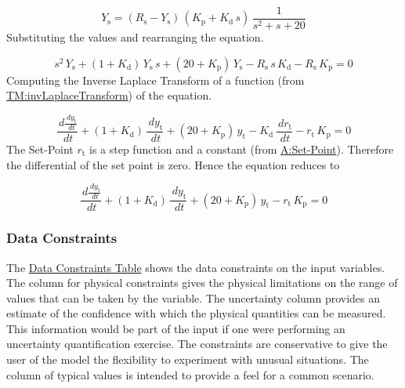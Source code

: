 \documentclass[12pt]{article}
\begin{document}
\begin{displaymath}
{Y_{\text{s}}}=\left({R_{\text{s}}}-{Y_{\text{s}}}\right)\,\left({K_{\text{p}}}+{K_{\text{d}}}\,s\right)\,\frac{1}{s^{2}+s+20}
\end{displaymath}
Substituting the values and rearranging the equation.

\begin{displaymath}
s^{2}\,{Y_{\text{s}}}+\left(1+{K_{\text{d}}}\right)\,{Y_{\text{s}}}\,s+\left(20+{K_{\text{p}}}\right)\,{Y_{\text{s}}}-{R_{\text{s}}}\,s\,{K_{\text{d}}}-{R_{\text{s}}}\,{K_{\text{p}}}=0
\end{displaymath}
Computing the Inverse Laplace Transform of a function (from \hyperref[TM:invLaplaceTransform]{TM:invLaplaceTransform}) of the equation.

\begin{displaymath}
\frac{\,d\frac{\,d{y_{\text{t}}}}{\,dt}}{\,dt}+\left(1+{K_{\text{d}}}\right)\,\frac{\,d{y_{\text{t}}}}{\,dt}+\left(20+{K_{\text{p}}}\right)\,{y_{\text{t}}}-{K_{\text{d}}}\,\frac{\,d{r_{\text{t}}}}{\,dt}-{r_{\text{t}}}\,{K_{\text{p}}}=0
\end{displaymath}
The Set-Point ${r_{\text{t}}}$ is a step function and a constant (from \hyperref[setPoint]{A:Set-Point}). Therefore the differential of the set point is zero. Hence the equation reduces to

\begin{displaymath}
\frac{\,d\frac{\,d{y_{\text{t}}}}{\,dt}}{\,dt}+\left(1+{K_{\text{d}}}\right)\,\frac{\,d{y_{\text{t}}}}{\,dt}+\left(20+{K_{\text{p}}}\right)\,{y_{\text{t}}}-{r_{\text{t}}}\,{K_{\text{p}}}=0
\end{displaymath}
\subsubsection{Data Constraints}
\label{Sec:DataConstraints}
The \hyperref[Table:InDataConstraints]{Data Constraints Table} shows the data constraints on the input variables. The column for physical constraints gives the physical limitations on the range of values that can be taken by the variable. The uncertainty column provides an estimate of the confidence with which the physical quantities can be measured. This information would be part of the input if one were performing an uncertainty quantification exercise. The constraints are conservative to give the user of the model the flexibility to experiment with unusual situations. The column of typical values is intended to provide a feel for a common scenario.
\end{document}
